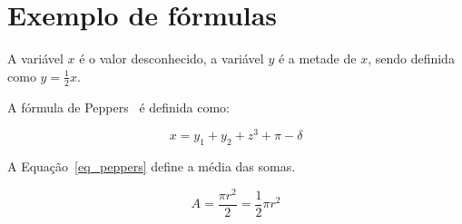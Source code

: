 \documentclass[12pt]{article}
\begin{document}
\section{Exemplo de fórmulas}

A variável $x$ é o valor desconhecido, a variável $y$ é a metade de $x$, sendo definida como $y=\frac{1}{2}x$.

A fórmula de Peppers~\cite{berg2006logica} é definida como:

$$
  x = y_1 + y_2 + z^3 + \pi - \delta
$$

A Equação~\ref{eq_peppers} define a média das somas.

\begin{equation}\label{eq_peppers}
A = \frac{\pi r^2}{2} = \frac{1}{2} \pi r^2   
\end{equation} 














  
\end{document}

